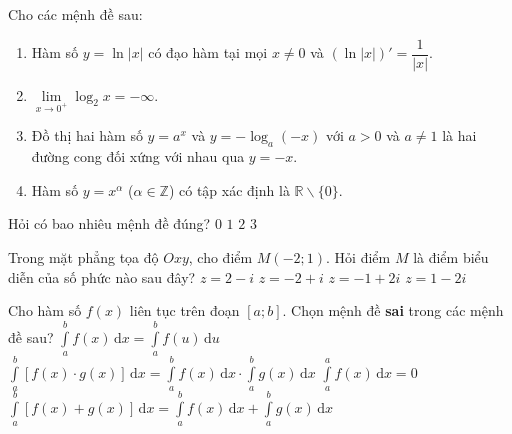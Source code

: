 \begin{ex}%
Cho các mệnh đề sau:
\begin{enumerate}
\item Hàm số $y=\ln|x| $ có đạo hàm tại  mọi $x \ne 0$ và $\left(\ln|x|\right)' = \dfrac{1}{|x|}.$
\item $\underset{x \rightarrow 0^+}{\lim} \log_2 x = -\infty$.
\item Đồ thị hai hàm số $y=a^x$ và $y = -\log_a(-x)$ với $a>0$ và $a\ne 1$ là hai đường cong đối xứng với nhau qua $y=-x$.
\item Hàm số $y=x^\alpha$ ($\alpha \in \mathbb{Z}$) có tập xác định là $\mathbb{R}\backslash \{0\}$.
\end{enumerate}
Hỏi có bao nhiêu mệnh đề đúng?
\choice
{$0$}
{$1$}
{\True $2$}
{$3$}
\end{ex}


\begin{ex}%
Trong mặt phẳng tọa độ   $Oxy$,   cho điểm  $M(-2;1)$.  Hỏi điểm $M$  là điểm biểu diễn của số  phức nào sau đây?
\choice
{$z=2-i$}
{\True $z=-2+i$}
{$z=-1+2i$}
{$z=1-2i$}
\end{ex}

\begin{ex}%
Cho hàm số  
$f(x)$  liên tục trên đoạn $[a;b]$. Chọn mệnh đề  {\bf sai} trong các mệnh đề sau?
\choice
{$\displaystyle\int\limits_a^b f(x)\mathrm{\,d}x =\displaystyle\int\limits_a^b f(u)\mathrm{\,d}u$}
{\True $\displaystyle\int\limits_a^b \left[f(x)\cdot g(x)\right]\mathrm{\,d}x=\displaystyle\int\limits_a^b f(x)\mathrm{\,d}x \cdot \displaystyle\int\limits_a^b g(x)\mathrm{\,d}x$}
{$\displaystyle\int\limits_a^a f(x)\mathrm{\,d}x =0$}
{$\displaystyle\int\limits_a^b \left[f(x)+g(x)\right]\mathrm{\,d}x=\displaystyle\int\limits_a^b f(x)\mathrm{\,d}x + \displaystyle\int\limits_a^b g(x)\mathrm{\,d}x$}
\end{ex}


